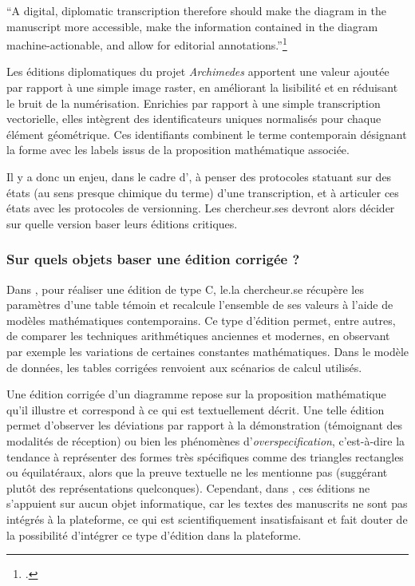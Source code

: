\begin{kwote}
``A digital, diplomatic transcription therefore should make the diagram
in the manuscript more accessible, make the information contained in the
diagram machine-actionable, and allow for editorial
annotations.''\footcite[p.78]{roughan_digital_2014}
\end{kwote}

Les éditions diplomatiques du projet \textit{Archimedes} apportent une valeur
ajoutée par rapport à une simple image raster, en améliorant la
lisibilité et en réduisant le bruit de la numérisation. Enrichies par
rapport à une simple transcription vectorielle, elles intègrent des
identificateurs uniques normalisés pour chaque élément géométrique. Ces
identifiants combinent le terme contemporain désignant la forme avec les
labels issus de la proposition mathématique associée.

Il y a donc un enjeu, dans le cadre d'\eida, à penser des protocoles
statuant sur des états (au sens presque chimique du terme) d'une
transcription, et à articuler ces états avec les protocoles de
versionning. Les chercheur.ses devront alors décider sur quelle version
baser leurs éditions critiques.

\hypertarget{sur-quels-objets-baser-une-edition-corrigee}{%
\subsubsection{Sur quels objets baser une édition corrigée
?}\label{sur-quels-objets-baser-une-edition-corrigee}}

Dans \dishas, pour réaliser une édition de type C, le.la chercheur.se récupère
les paramètres d'une table témoin et recalcule l'ensemble de ses valeurs
à l'aide de modèles mathématiques contemporains. Ce type d'édition
permet, entre autres, de comparer les techniques arithmétiques anciennes
et modernes, en observant par exemple les variations de certaines
constantes mathématiques. Dans le modèle de données, les tables
corrigées renvoient aux scénarios de calcul utilisés.

Une édition corrigée d'un diagramme repose sur la proposition
mathématique qu'il illustre et correspond à ce qui est textuellement
décrit. Une telle édition permet d'observer les déviations par rapport à
la démonstration (témoignant des modalités de réception) ou bien les
phénomènes d'\emph{overspecification}, c'est-à-dire la tendance à
représenter des formes très spécifiques comme des triangles rectangles
ou équilatéraux, alors que la preuve textuelle ne les mentionne pas
(suggérant plutôt des représentations quelconques). Cependant, dans
\eida, ces éditions ne s'appuient sur aucun objet informatique, car les
textes des manuscrits ne sont pas intégrés à la plateforme, ce qui est
scientifiquement insatisfaisant et fait douter de la possibilité
d'intégrer ce type d'édition dans la plateforme.

